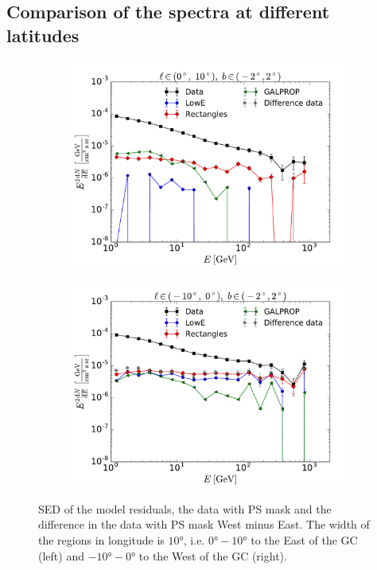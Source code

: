 \subsection{Comparison of the spectra at different latitudes}

\begin{figure}[h]
    \begin{subfigure}{0.5\textwidth}
        \includegraphics[width=\textwidth]{plots/SED_all_models_source_l=5_b=0.pdf}
    \end{subfigure} 
    \begin{subfigure}{0.5\textwidth}
        \includegraphics[width=\textwidth]{plots/SED_all_models_source_l=-5_b=0.pdf}
    \end{subfigure}
  	\caption{SED of the model residuals, the data with PS mask and the difference in the data with PS mask West minus East. The width of the regions in longitude is $\ang{10}$, i.e. $\ang{0} - \ang{10}$ to the East of the GC (left) and $\ang{-10} - \ang{0}$ to the West of the GC (right).}
  	\label{fig:SED_all}
\end{figure}

